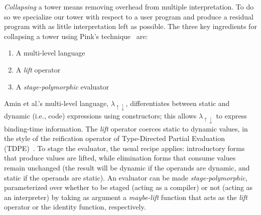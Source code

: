 \documentclass[sigplan,anonymous,review]{acmart}
\newcommand{\mslang}{$\lambda_{\uparrow\downarrow}$}
\theoremstyle{definition}
\begin{document}
\textit{Collapsing} a tower means removing overhead from multiple interpretation. To do so we specialize our tower with respect to a user program and produce a residual program with as little interpretation left as possible. The three key ingredients for collapsing a tower using Pink's technique~\cite{amin2017collapsing} are:
\begin{enumerate}
    \item A multi-level language
    \item A \textit{lift} operator
    \item A \textit{stage-polymorphic} evaluator
\end{enumerate}
Amin et al.'s multi-level language, \mslang, differentiates between static and dynamic (i.e., code) expressions using constructors;
this allows \mslang{} to express binding-time information. The
\textit{lift} operator coerces static to dynamic values, in the style
of the reification operator of Type-Directed Partial Evaluation (TDPE)~\cite{danvy1999type}.
To stage the evaluator, the usual recipe applies: introductory forms that
produce values are lifted, while elimination forms that consume values
remain unchanged (the result will be dynamic if the operands are
dynamic, and static if the operands are static). An evaluator can be
made \textit{stage-polymorphic}, parameterized over whether to be
staged (acting as a compiler) or not (acting as an interpreter) by
taking as argument a \textit{maybe-lift} function that acts as the
\textit{lift} operator or the identity function, respectively.
\end{document}
